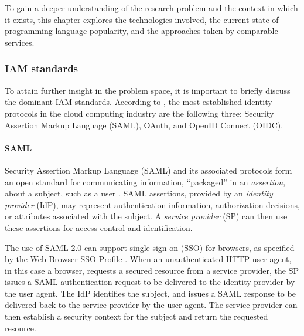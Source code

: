 \chapter{}%
\label{ch:stand-van-zaken}



To gain a deeper understanding of the research problem and the context in which it exists, this chapter explores the technologies involved, the current state of programming language popularity, and the approaches taken by comparable services.

\subsection{IAM standards}
To attain further insight in the problem space, it is important to briefly discuss the dominant IAM standards. According to \textcite{Naik2016}, the most established identity protocols in the cloud computing industry are the following three: Security Assertion Markup Language (SAML), OAuth, and OpenID Connect (OIDC). 

\subsubsection{SAML}
Security Assertion Markup Language (SAML) and its associated protocols form an open standard for communicating information, ``packaged'' in an \emph{assertion}, about a subject, such as a user \autocite{Kemp2005}. SAML assertions, provided by an \emph{identity provider} (IdP), may represent authentication information, authorization decisions, or attributes associated with the subject. A \emph{service provider} (SP) can then use these assertions for access control and identification.

The use of SAML 2.0 can support single sign-on (SSO) for browsers, as specified by the Web Browser SSO Profile \autocite{Hughes2005}. When an unauthenticated HTTP user agent, in this case a browser, requests a secured resource from a service provider, the SP issues a SAML authentication request to be delivered to the identity provider by the user agent. The IdP identifies the subject, and issues a SAML response to be delivered back to the service provider by the user agent. The service provider can then establish a security context for the subject and return the requested resource. 

